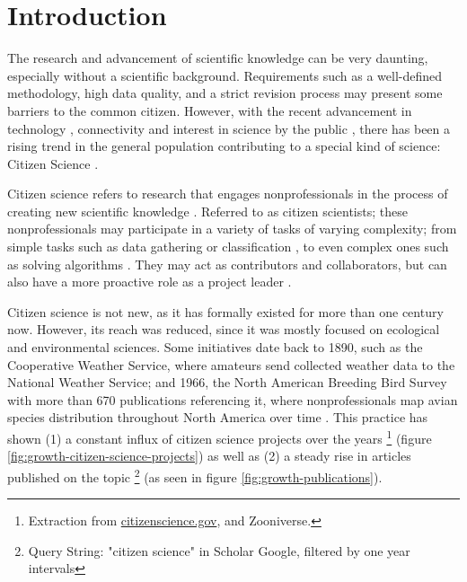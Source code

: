 \chapter*[Introduction]{Introduction}
\label{chap:introduction}

The research and advancement of scientific knowledge can be very daunting, especially without a scientific background. Requirements such as a well-defined methodology, high data quality, and a strict revision process may present some barriers to the common citizen. However, with the recent advancement in technology \cite{newman2012future}, connectivity \cite{newman2012future} and interest in science by the public \cite{silvertown2009new}, there has been a rising trend in the general population contributing to a special kind of science: Citizen Science \cite{mckinley2017citizen}.

Citizen science refers to research that engages nonprofessionals in the process of creating new scientific knowledge \cite{bonney2014next}. Referred to as citizen scientists; these nonprofessionals may participate in a variety of tasks of varying complexity; from simple tasks such as data gathering or classification \cite{barker2013pascal}, to even complex ones such as solving algorithms \cite{cooper2010predicting}. They may act as contributors and collaborators, but can also have a more proactive role as a project leader \cite{robinson2018ten}.

Citizen science is not new, as it has formally existed for more than one century now. However, its reach was reduced, since it was mostly focused on ecological and environmental sciences. Some initiatives date back to 1890, such as the Cooperative Weather Service, where amateurs send collected weather data to the National Weather Service; and 1966, the North American Breeding Bird Survey with more than 670 publications referencing it, where nonprofessionals map avian species distribution throughout North America over time \cite{kosmala2016assessing}. This practice has shown (1) a constant influx of citizen science projects over the years \footnote{Extraction from \url{citizenscience.gov}, and Zooniverse.} (figure \ref{fig:growth-citizen-science-projects}) as well as (2) a steady rise in articles published on the topic \footnote{Query String: "citizen science" in Scholar Google, filtered by one year intervals} (as seen in figure \ref{fig:growth-publications}).

\publicationdata

